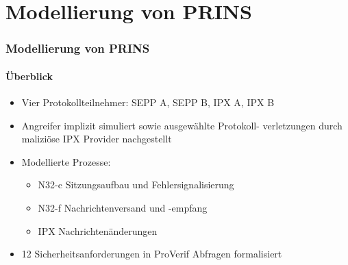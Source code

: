 \documentclass{beamer}
\begin{document}
\section{Modellierung von PRINS}

\begin{frame}
    \frametitle{Modellierung von PRINS}
    \framesubtitle{Überblick}

    \begin{itemize}

        \item<1-> Vier Protokollteilnehmer: SEPP A, SEPP B, IPX A, IPX B
        \vspace*{2mm}
        \item<2-> Angreifer implizit simuliert sowie ausgewählte Protokoll- verletzungen durch maliziöse IPX Provider nachgestellt
        \vspace*{2mm}
        \item<3-> Modellierte Prozesse:
        \begin{itemize}
            \item<3-> N32-c Sitzungsaufbau und Fehlersignalisierung
            \item<3-> N32-f Nachrichtenversand und -empfang
            \item<3-> IPX Nachrichtenänderungen
        \end{itemize}
        \vspace*{2mm}
        \item<4-> 12 Sicherheitsanforderungen in ProVerif Abfragen formalisiert
    \end{itemize}
\end{frame}
\end{document}

